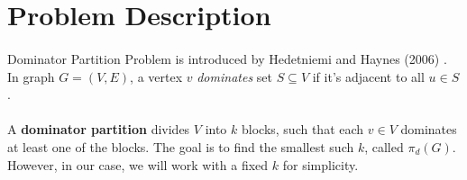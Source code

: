 \section{Problem Description}

\paragraph{} Dominator Partition Problem is introduced by Hedetniemi and Haynes (2006) \cite{dominator_partitions}. In graph $G = (V, E)$, a vertex $v$ \textit{dominates} set $S \subseteq V$ if it's adjacent to all $u \in S$. 

\paragraph{} A \textbf{dominator partition} divides $V$ into $k$ blocks, such that each $v \in V$ dominates at least one of the blocks. The goal is to find the smallest such $k$, called $\pi_d(G)$. However, in our case, we will work with a fixed $k$ for simplicity.